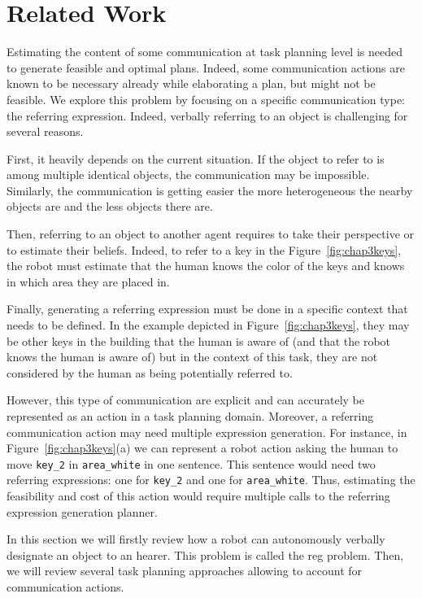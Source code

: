 \documentclass[a4paper,11pt,twoside]{StyleThese}
\begin{document}
\section{Related Work}
Estimating the content of some communication at task planning level is needed to generate feasible and optimal plans. Indeed, some communication actions are known to be necessary already while elaborating a plan, but might not be feasible. We explore this problem by focusing on a specific communication type: the referring expression. Indeed, verbally referring to an object is challenging for several reasons. 

First, it heavily depends on the current situation. If the object to refer to is among multiple identical objects, the communication may be impossible. Similarly, the communication is getting easier the more heterogeneous the nearby objects are and the less objects there are. 

Then, referring to an object to another agent requires to take their perspective or to estimate their beliefs. Indeed, to refer to a key in the Figure~\ref{fig:chap3keys}, the robot must estimate that the human knows the color of the keys and knows in which area they are placed in.

Finally, generating a referring expression must be done in a specific context that needs to be defined. In the example depicted in Figure~\ref{fig:chap3keys}, they may be other keys in the building that the human is aware of (and that the robot knows the human is aware of) but in the context of this task, they are not considered by the human as being potentially referred to.

However, this type of communication are explicit and can accurately be represented as an action in a task planning domain. Moreover, a referring communication action may need multiple expression generation. For instance, in Figure~\ref{fig:chap3keys}(a) we can represent a robot action asking the human to move \verb'key_2' in \verb'area_white' in one sentence. This sentence would need two referring expressions: one for \verb'key_2' and one for \verb'area_white'. Thus, estimating the feasibility and cost of this action would require multiple calls to the referring expression generation planner.

In this section we will firstly review how a robot can autonomously verbally designate an object to an hearer. This problem is called the \acrfull{reg} problem.
Then, we will review several task planning approaches allowing to account for communication actions.
\end{document}

